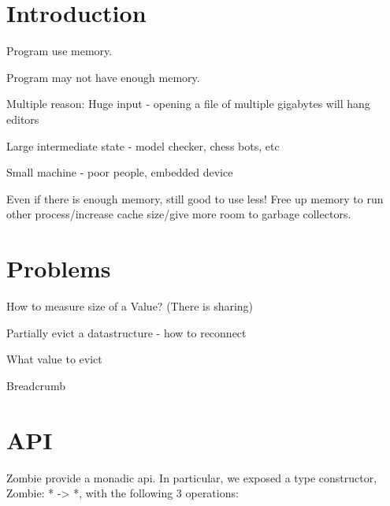 \documentclass[acmsmall]{acmart}
\begin{document}
		
	
	
	\maketitle
	
	\section{Introduction}
	Program use memory.
	
	Program may not have enough memory.
	
	Multiple reason:
	Huge input - opening a file of multiple gigabytes will hang editors
	
	Large intermediate state - model checker, chess bots, etc
	
	Small machine - poor people, embedded device
	
	Even if there is enough memory, still good to use less!
	Free up memory to run other process/increase cache size/give more room to garbage collectors.
	
	\section{Problems}
	How to measure size of a Value? (There is sharing)
	
	Partially evict a datastructure - how to reconnect
	
	What value to evict
	
	Breadcrumb
	
	\section{API}
	Zombie provide a monadic api.
	In particular, we exposed a type constructor, Zombie: * -> *,
	with the following 3 operations:
	
\end{document}
